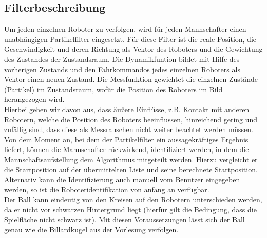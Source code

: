 \documentclass{ezb}
\begin{document}
\subsection{Filterbeschreibung}
Um jeden einzelnen Roboter zu verfolgen, wird für jeden Mannschafter einen unabhängigen Partikelfilter eingesetzt.
Für diese Filter ist die reale Position, die Geschwindigkeit und deren Richtung als Vektor des Roboters und die Gewichtung des Zustandes der Zustandsraum. Die Dynamikfuntion bildet mit Hilfe des vorherigen Zustands und den Fahrkommandos jedes einzelnen Roboters als Vektor einen neuen Zustand. Die Messfunktion gewichtet die einzelnen Zustände (Partikel) im Zustandsraum, wofür die Position des Roboters im Bild herangezogen wird.\\
\linebreak
Hierbei gehen wir davon aus, dass äußere Einflüsse, z.B. Kontakt mit anderen Robotern, welche die Position des Roboters beeinflussen, hinreichend gering und zufällig sind, dass diese als Messrauschen nicht weiter beachtet werden müssen.\\
\linebreak
Von dem Moment an, bei dem der Partikelfilter ein aussagekräftiges Ergebnis liefert, können die Mannschafter rückwirkend, identifiziert werden, in dem die Mannschaftsaufstellung dem Algorithmus mitgeteilt werden. Hierzu vergleicht er die Startposition auf der übermittelten Liste und seine berechnete Startposition. Alternativ kann die Identifizierung auch manuell vom Benutzer eingegeben werden, so ist die Roboteridentifikation von anfang an verfügbar.\\
\linebreak
Der Ball kann eindeutig von den Kreisen auf den Robotern unterschieden werden, da er nicht vor schwarzen Hintergrund liegt (hierfür gilt die Bedingung, dass die Spielfläche nicht schwarz ist). Mit diesen Voraussetzungen lässt sich der Ball genau wie die Billardkugel aus der Vorlesung verfolgen.\\
\linebreak
\end{document}
